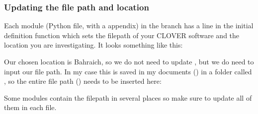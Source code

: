 \documentclass[letterpaper,10pt,english]{sphinxmanual}
\begin{document}
\subsubsection{Updating the file path and location}
\label{\detokenize{general_setup:updating-the-file-path-and-location}}
\sphinxAtStartPar
Each module (Python file, with a  appendix) in the 
branch has a line in the initial definition function which sets the
filepath of your CLOVER software and the location you are investigating.
It looks something like this:

\begin{sphinxVerbatim}[commandchars=\\\{\}]
 
      
      
\end{sphinxVerbatim}

\sphinxAtStartPar
Our chosen location is Bahraich, so we do not need to update
, but we do need to input our file path. In my case this
is saved in my documents () in a folder called ,
so the entire file path () needs to be inserted
here:

\begin{sphinxVerbatim}[commandchars=\\\{\}]
  
\end{sphinxVerbatim}

\sphinxAtStartPar
Some modules contain the filepath in several places so make sure to
update all of them in each file. 
\end{document}

